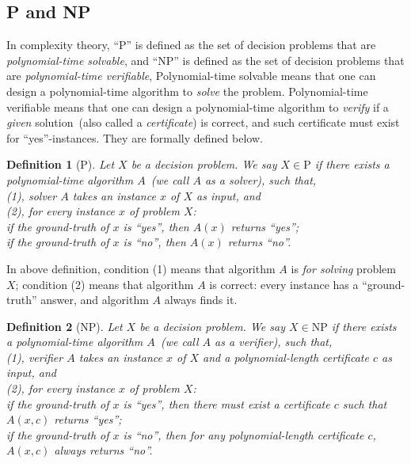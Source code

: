 \documentclass[letterpaper,11pt]{article}
\theoremstyle{mytheorem}
\newtheorem{definition}{Definition}
\begin{document}
\subsection*{P and NP}

In complexity theory, ``P'' is defined as the set of decision problems that are \emph{polynomial-time solvable}, 
and ``NP'' is defined as the set of decision problems that are \emph{polynomial-time verifiable}, 
Polynomial-time solvable means that one can design a polynomial-time algorithm to \emph{solve} the problem.
Polynomial-time verifiable means that one can design a polynomial-time algorithm to \emph{verify}
if a \emph{given} solution~(also called a \emph{certificate}) is correct,  
and such certificate must exist for ``yes''-instances.
They are formally defined below.


\begin{definition}[P]
Let $X$ be a decision problem. We say $X\in \textrm{P}$ if there exists a polynomial-time algorithm $A$~(we call $A$ as a \emph{solver}), such that,\\
	(1), solver $A$ takes an instance $x$ of $X$ as input, and \\
	(2), for every instance $x$ of problem $X$: \\
	\hspace*{0.2cm} if the ground-truth of $x$ is ``yes'', then $A(x)$ returns ``yes'';\\
	\hspace*{0.2cm} if the ground-truth of $x$ is ``no'', then $A(x)$ returns ``no''.
\end{definition}

In above definition, condition (1) means that algorithm $A$ is \emph{for solving} problem $X$;
condition (2) means that algorithm $A$ is correct: every instance has a ``ground-truth'' answer, and
algorithm $A$ always finds it.

\begin{definition}[NP]
Let $X$ be a decision problem. We say $X\in \textrm{NP}$ if there exists a polynomial-time algorithm $A$~(we call $A$ as a \emph{verifier}), such that,\\
	(1), verifier $A$ takes an instance $x$ of $X$ \emph{and} a polynomial-length certificate $c$ as input, and \\
	(2), for every instance $x$ of problem $X$: \\
	\hspace*{0.2cm} if the ground-truth of $x$ is ``yes'', then there must exist a certificate $c$ such that $A(x,c)$ returns ``yes'';\\
	\hspace*{0.2cm} if the ground-truth of $x$ is ``no'', then for any polynomial-length certificate $c$, $A(x,c)$ always returns ``no''.
\end{definition}
\end{document}
